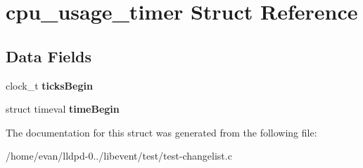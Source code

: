 \section{cpu\-\_\-usage\-\_\-timer \-Struct \-Reference}
\label{structcpu__usage__timer}
\subsection*{\-Data \-Fields}
\begin{DoxyCompactItemize}
\item 
clock\-\_\-t {\bfseries ticks\-Begin}\label{structcpu__usage__timer_a8e86b5074ec0181171ab2725aa2e35f1}

\item 
struct timeval {\bfseries time\-Begin}\label{structcpu__usage__timer_aa4625dc744fdcc5e04104fc25c35ed9d}

\end{DoxyCompactItemize}


\-The documentation for this struct was generated from the following file\-:\begin{DoxyCompactItemize}
\item 
/home/evan/lldpd-\/0../libevent/test/test-\/changelist.\-c\end{DoxyCompactItemize}
